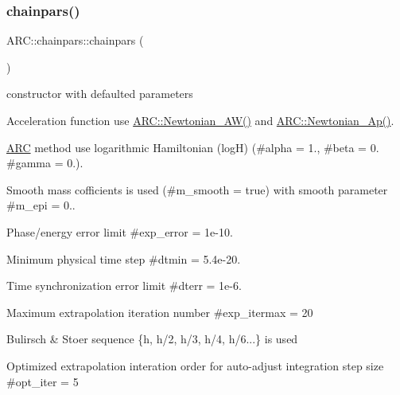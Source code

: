 \subsubsection{\texorpdfstring{chainpars()}{chainpars()}\hspace{0.1cm}{\footnotesize\ttfamily [1/2]}}
{\footnotesize\ttfamily A\+R\+C\+::chainpars\+::chainpars (\begin{DoxyParamCaption}{ }\end{DoxyParamCaption})\hspace{0.3cm}{\ttfamily [inline]}}



constructor with defaulted parameters 


\begin{DoxyItemize}
\item Acceleration function use \hyperlink{namespaceARC_a3c3f20df43ba5df3e21857643130d784}{A\+R\+C\+::\+Newtonian\+\_\+\+A\+W()} and \hyperlink{namespaceARC_a6b8ee871e0832b6b59968ea9069877e0}{A\+R\+C\+::\+Newtonian\+\_\+\+Ap()}.
\item \hyperlink{namespaceARC}{A\+RC} method use logarithmic Hamiltonian (logH) (\#alpha = 1., \#beta = 0. \#gamma = 0.).
\item Smooth mass cofficients is used (\#m\+\_\+smooth = true) with smooth parameter \#m\+\_\+epi = 0..
\item Phase/energy error limit \#exp\+\_\+error = 1e-\/10.
\item Minimum physical time step \#dtmin = 5.\+4e-\/20.
\item Time synchronization error limit \#dterr = 1e-\/6.
\item Maximum extrapolation iteration number \#exp\+\_\+itermax = 20
\item Bulirsch \& Stoer sequence \{h, h/2, h/3, h/4, h/6...\} is used
\item Optimized extrapolation interation order for auto-\/adjust integration step size \#opt\+\_\+iter = 5 
\end{DoxyItemize}\hypertarget{classARC_1_1chainpars_a6495ce7c673679d5768e309887e0d502}{}\label{classARC_1_1chainpars_a6495ce7c673679d5768e309887e0d502} 
